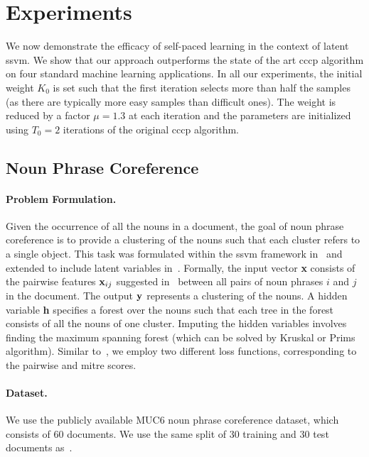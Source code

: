 \documentclass{article}
\newcommand{\mysection}[1]{\vspace{-4mm}\section{#1}\vspace{-4mm}}
\newcommand{\mysubsection}[1]{\vspace{-3mm}\subsection{#1}\vspace{-3mm}}
\newcommand{\myparagraph}[1]{\vspace{-2mm}\paragraph{#1}}
\begin{document}
\mysection{Experiments}
\label{sec:experiments}
We now demonstrate the efficacy of self-paced learning in the context
of latent {\sc ssvm}. We show that our approach outperforms the
state of the art {\sc cccp} algorithm on four standard machine learning
applications. In all our
experiments, the initial weight $K_0$ is set such that the
first iteration selects more than half the samples (as there are
typically more easy samples than difficult ones).
The weight is reduced by a factor $\mu = 1.3$ at each iteration
and the parameters are initialized using $T_0 = 2$ iterations of the original
{\sc cccp} algorithm.

\mysubsection{Noun Phrase Coreference}
\label{subsec:nounphrase}

\paragraph{Problem Formulation.}
Given the occurrence of all the nouns in a document,
the goal of noun phrase coreference is to provide a clustering of the nouns such that each cluster
refers to a single object. This task was formulated within the {\sc ssvm} framework in~\cite{finleyicml05}
and extended to include latent variables in~\cite{yuicml09}. Formally, the input vector {\bf x}
consists of the pairwise features ${\bf x}_{ij}$ suggested in~\cite{ngacl02}
between all pairs of noun phrases $i$ and $j$ in the document.
The output ${\bf y}$ represents a clustering of the nouns. A hidden variable {\bf h} specifies a
forest over the nouns such that each tree in the forest consists of all the nouns of one cluster.
Imputing the hidden variables involves finding the maximum spanning
forest (which can be solved by Kruskal or Prims algorithm).
Similar to~\cite{yuicml09}, we employ two different loss functions, corresponding to the 
pairwise and {\sc mitre} scores.

\myparagraph{Dataset.} We use the publicly available MUC6 noun phrase coreference dataset, which consists
of 60 documents. We use the same split of 30 training and 30 test documents as~\cite{yuicml09}.
\end{document}
